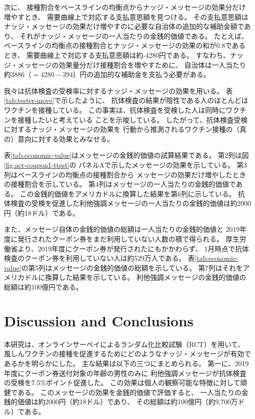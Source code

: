 \documentclass[
  11pt,
  a4paper,
]{article}
\begin{document}
次に、
接種割合をベースラインの均衡点からナッジ・メッセージの効果分だけ増やすとき、
需要曲線上で対応する支払意思額を見つける。
その支払意思額は
ナッジ・メッセージの効果だけ増やすのに必要な自治体の追加的な補助金額であり、
それがナッジ・メッセージの一人当たりの金銭的価値である。
たとえば、
ベースラインの均衡点の接種割合とナッジ・メッセージの効果の和が0.8であるとき、
需要曲線上で対応する支払意思額は約-4280円である。
すなわち、ナッジ・メッセージの効果量分だけ接種割合を増やすために、
自治体は一人当たり約3886（\(=4280-394\)）円の追加的な補助金を支払う必要がある。

我々は抗体検査の受検率に対するナッジ・メッセージの効果を用いる。
表\ref{tab:tester-move}で示したように、
抗体検査の結果が陰性である人のほとんどはワクチンを接種している。
この事実は、抗体検査を受検した人は同時にワクチンを接種したいと考えている
ことを示唆している。
したがって、抗体検査受検に対するナッジ・メッセージの効果を
行動から推測されるワクチン接種の（真の）意向に対する効果とみなせる。

表\ref{tab:economic-value}はメッセージの金銭的価値の試算結果である。
第2列は図\ref{fig:act-coupon1-ttest}の
パネルAで示したメッセージの効果を示している。
第3列はベースラインの均衡点の接種割合から
メッセージの効果だけ増やしたときの接種割合を示している。
第4列はメッセージの一人当たりの金銭的価値である。
この金銭的価値をアメリカドルに換算した結果を第6列に示している。
抗体検査の受検を促進した利他強調メッセージの一人当たりの金銭的価値は約2000円（約18ドル）である。

また、メッセージ自体の金銭的価値の総額は一人当たりの金銭的価値と
2019年度に発行されたクーポン券をまだ利用していない人数の積で得られる。
厚生労働省より、2019年度にクーポン券が発行されたにもかかわらず、
1月時点で抗体検査のクーポン券を利用していない人は約529万人である。
表\ref{tab:economic-value}の第5列はメッセージの金銭的価値の総額を示している。
第7列はそれをアメリカドルに換算した結果を示している。
利他強調メッセージの金銭的価値の総額は約100億円である。

\hypertarget{conclusion}{%
\section{Discussion and Conclusions}\label{conclusion}}

本研究は、オンラインサーベイによるランダム化比較試験（RCT）を用いて、
風しんワクチンの接種を促進するためにどのようなナッジ・メッセージが有効であるかを明らかにした。
主な結果は以下の三つにまとめられる。
第一に、2019年度にクーポン券送付対象の年齢の男性のみに
利他強調メッセージが抗体検査の受検を7.5\%ポイント促進した。
この効果は個人の観察可能な特徴に対して頑健である。
このメッセージの効果を金銭的価値で評価すると、
一人当たりの金銭的価値は約2000円（約18ドル）であり、
その総額は約100億円（約9,700万ドル）である。
\end{document}
